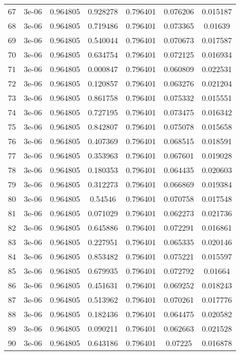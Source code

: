 \begin{table}
\begin{tabular*}{\linewidth}{c|c|c|c|c|c|c}
67 & 3e-06 & 0.964805 & 0.928278 & 0.796401 & 0.076206 & 0.015187\\
68 & 3e-06 & 0.964805 & 0.719486 & 0.796401 & 0.073365 & 0.01639\\
69 & 3e-06 & 0.964805 & 0.540044 & 0.796401 & 0.070673 & 0.017587\\
70 & 3e-06 & 0.964805 & 0.634754 & 0.796401 & 0.072125 & 0.016934\\
71 & 3e-06 & 0.964805 & 0.000847 & 0.796401 & 0.060809 & 0.022531\\
72 & 3e-06 & 0.964805 & 0.120857 & 0.796401 & 0.063276 & 0.021204\\
73 & 3e-06 & 0.964805 & 0.861758 & 0.796401 & 0.075332 & 0.015551\\
74 & 3e-06 & 0.964805 & 0.727195 & 0.796401 & 0.073475 & 0.016342\\
75 & 3e-06 & 0.964805 & 0.842807 & 0.796401 & 0.075078 & 0.015658\\
76 & 3e-06 & 0.964805 & 0.407369 & 0.796401 & 0.068515 & 0.018591\\
77 & 3e-06 & 0.964805 & 0.353963 & 0.796401 & 0.067601 & 0.019028\\
78 & 3e-06 & 0.964805 & 0.180353 & 0.796401 & 0.064435 & 0.020603\\
79 & 3e-06 & 0.964805 & 0.312273 & 0.796401 & 0.066869 & 0.019384\\
80 & 3e-06 & 0.964805 & 0.54546 & 0.796401 & 0.070758 & 0.017548\\
81 & 3e-06 & 0.964805 & 0.071029 & 0.796401 & 0.062273 & 0.021736\\
82 & 3e-06 & 0.964805 & 0.645886 & 0.796401 & 0.072291 & 0.016861\\
83 & 3e-06 & 0.964805 & 0.227951 & 0.796401 & 0.065335 & 0.020146\\
84 & 3e-06 & 0.964805 & 0.853482 & 0.796401 & 0.075221 & 0.015597\\
85 & 3e-06 & 0.964805 & 0.679935 & 0.796401 & 0.072792 & 0.01664\\
86 & 3e-06 & 0.964805 & 0.451631 & 0.796401 & 0.069252 & 0.018243\\
87 & 3e-06 & 0.964805 & 0.513962 & 0.796401 & 0.070261 & 0.017776\\
88 & 3e-06 & 0.964805 & 0.182436 & 0.796401 & 0.064475 & 0.020582\\
89 & 3e-06 & 0.964805 & 0.090211 & 0.796401 & 0.062663 & 0.021528\\
90 & 3e-06 & 0.964805 & 0.643186 & 0.796401 & 0.07225 & 0.016878\\
\end{tabular*}
\end{table}
